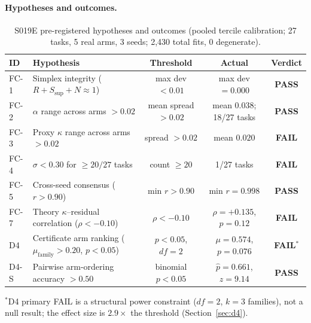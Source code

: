 \documentclass{article}
\begin{document}
\paragraph{Hypotheses and outcomes.}

\begin{table}[htbp]
\centering
\small
\caption{S019E pre-registered hypotheses and outcomes (pooled tercile calibration; 27 tasks, 5 real arms, 3 seeds; 2{,}430 total fits, 0 degenerate).}
\label{tab:s019e_hypotheses}
\begin{tabular}{llccc}
\toprule
\textbf{ID} & \textbf{Hypothesis} & \textbf{Threshold} & \textbf{Actual} & \textbf{Verdict} \\
\midrule
FC-1 & Simplex integrity ($R+S_{\text{sup}}+N \approx 1$) & max dev $< 0.01$ & max dev $= 0.000$ & \textbf{PASS} \\
FC-2 & $\alpha$ range across arms $> 0.02$ & mean spread $> 0.02$ & mean $0.038$; 18/27 tasks & \textbf{PASS} \\
FC-3 & Proxy $\kappa$ range across arms $> 0.02$ & spread $> 0.02$ & mean $0.020$ & \textbf{FAIL} \\
FC-4 & $\sigma < 0.30$ for $\geq 20/27$ tasks & count $\geq 20$ & 1/27 tasks & \textbf{FAIL} \\
FC-5 & Cross-seed consensus ($r > 0.90$) & min $r > 0.90$ & min $r = 0.998$ & \textbf{PASS} \\
FC-7 & Theory $\kappa$--residual correlation ($\rho < -0.10$) & $\rho < -0.10$ & $\rho = +0.135$, $p = 0.12$ & \textbf{FAIL} \\
D4 & Certificate arm ranking ($\mu_{\text{family}} > 0.20$, $p < 0.05$) & $p < 0.05$, $df = 2$ & $\mu = 0.574$, $p = 0.076$ & \textbf{FAIL}$^{*}$ \\
D4-S & Pairwise arm-ordering accuracy $> 0.50$ & binomial $p < 0.05$ & $\hat{p} = 0.661$, $z = 9.14$ & \textbf{PASS} \\
\bottomrule
\end{tabular}
\end{table}

\noindent $^{*}$D4 primary FAIL is a structural power constraint ($df = 2$, $k = 3$ families), not a null result; the effect size is $2.9{\times}$ the threshold (Section~\ref{sec:d4}).
\end{document}
